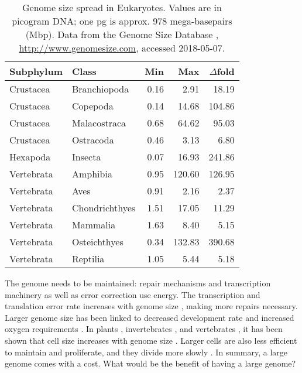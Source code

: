 \begin{table}
\centering
\caption[Genome size spread in Eukaryotes]{Genome size spread in
Eukaryotes. Values are in picogram DNA; one pg is approx. 978
mega-basepairs (Mbp). Data from the Genome Size Database
\citep{Gregory2018}, \url{http://www.genomesize.com}, accessed
2018-05-07.}
\label{tab:genome-size-spread}
\begin{tabular}{@{}llrrr@{}}
\toprule
Subphylum  & Class              & Min  & Max    & $\Delta$fold  \\
\midrule
Crustacea  & Branchiopoda       & 0.16 &   2.91 &  18.19        \\
Crustacea  & Copepoda           & 0.14 &  14.68 & 104.86        \\
Crustacea  & Malacostraca       & 0.68 &  64.62 &  95.03        \\
Crustacea  & Ostracoda          & 0.46 &   3.13 &   6.80        \\
Hexapoda   & Insecta            & 0.07 &  16.93 & 241.86        \\
Vertebrata & Amphibia           & 0.95 & 120.60 & 126.95        \\
Vertebrata & Aves               & 0.91 &   2.16 &   2.37        \\
Vertebrata & Chondrichthyes     & 1.51 &  17.05 &  11.29        \\
Vertebrata & Mammalia           & 1.63 &   8.40 &   5.15        \\
Vertebrata & Osteichthyes       & 0.34 & 132.83 & 390.68        \\
Vertebrata & Reptilia           & 1.05 &   5.44 &   5.18        \\
\bottomrule
\end{tabular}
\end{table}

The genome needs to be maintained: repair mechanisms and transcription
machinery as well as error correction use energy. The transcription and
translation error rate increases with genome size \citep{Zaher2009},
making more repairs necessary. Larger genome size has been linked to
decreased development rate \citep{White2000} and increased oxygen
requirements \citep{Vinogradov1997, Gregory2002}. In plants
\citep{Grime1983}, invertebrates \citep{Gregory2005}, and vertebrates
\citep{Horner1983, Olmo1982, Gregory2000}, it has been shown that cell
size increases with genome size \citep{Dufresne2011}. Larger cells are
also less efficient to maintain and proliferate, and they divide more
slowly \citep{Bennett1977}. In summary, a large genome comes with a
cost. What would be the benefit of having a large genome?

